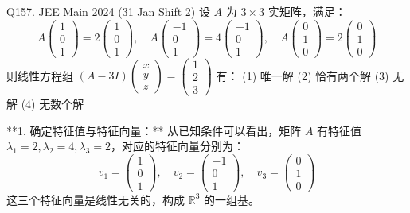 \begin{questions}
    \question
Q157. JEE Main 2024 (31 Jan Shift 2)
设 $A$ 为 $3 \times 3$ 实矩阵，满足：
\[ A \begin{pmatrix} 1 \\ 0 \\ 1 \end{pmatrix} = 2 \begin{pmatrix} 1 \\ 0 \\ 1 \end{pmatrix}, \quad A \begin{pmatrix} -1 \\ 0 \\ 1 \end{pmatrix} = 4 \begin{pmatrix} -1 \\ 0 \\ 1 \end{pmatrix}, \quad A \begin{pmatrix} 0 \\ 1 \\ 0 \end{pmatrix} = 2 \begin{pmatrix} 0 \\ 1 \\ 0 \end{pmatrix} \]
则线性方程组 $(A - 3I) \begin{pmatrix} x \\ y \\ z \end{pmatrix} = \begin{pmatrix} 1 \\ 2 \\ 3 \end{pmatrix}$ 有：
(1) 唯一解 \quad (2) 恰有两个解 \quad (3) 无解 \quad (4) 无数个解

\begin{solution}
**1. 确定特征值与特征向量：**
从已知条件可以看出，矩阵 $A$ 有特征值 $\lambda_1 = 2, \lambda_2 = 4, \lambda_3 = 2$，对应的特征向量分别为：
\[ v_1 = \begin{pmatrix} 1 \\ 0 \\ 1 \end{pmatrix}, \quad v_2 = \begin{pmatrix} -1 \\ 0 \\ 1 \end{pmatrix}, \quad v_3 = \begin{pmatrix} 0 \\ 1 \\ 0 \end{pmatrix} \]
这三个特征向量是线性无关的，构成 $\mathbb{R}^3$ 的一组基。


\end{solution}
\end{questions}
